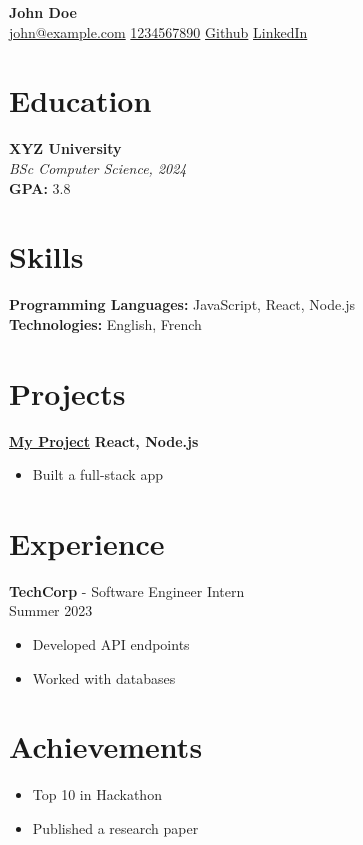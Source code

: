 \documentclass[10pt, letterpaper]{article}
\begin{document}
        \begin{center}
            {\LARGE\bfseries John Doe}\\[5pt]
            \faEnvelope[regular] \href{mailto:john@example.com}{john@example.com} \quad
            \faPhone* \href{tel:1234567890}{1234567890} \quad
            \faGithub \href{https://github.com/67a1deef13241926ddc383ec}{Github} \quad 
            \faLinkedin \href{https://linkedin.com/in/67a1deef13241926ddc383ec}{LinkedIn}
        \end{center}

        \section{Education}
        \noindent \textbf{XYZ University}\\
        \textit{BSc Computer Science, 2024}\\
        \textbf{GPA:} 3.8

        \section{Skills}
        \textbf{Programming Languages:} JavaScript, React, Node.js\\
        \textbf{Technologies:} English, French

        \section{Projects}
        
                \noindent \textbf{\large\href{https://github.com/myproject}{My Project}} \hfill \textbf{React, Node.js}\\
                \begin{itemize}
                    \item Built a full-stack app
                \end{itemize}
                \vspace{7pt}
            

        \section{Experience}
        
                \noindent \textbf{TechCorp} - Software Engineer Intern\\
                Summer 2023\\
                \begin{itemize}
                    \item Developed API endpoints
\item Worked with databases
                \end{itemize}
            

        \section{Achievements}
        \begin{itemize}
            \item Top 10 in Hackathon
\item Published a research paper
        \end{itemize}

        
\end{document}
